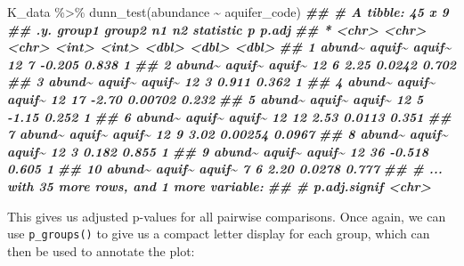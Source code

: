 \documentclass[
]{krantz}
\newenvironment{Shaded}{\begin{snugshade}}{\end{snugshade}}
\newcommand{\DocumentationTok}[1]{\textcolor[rgb]{0.56,0.35,0.01}{\textbf{\textit{#1}}}}
\newcommand{\FunctionTok}[1]{\textcolor[rgb]{0.00,0.00,0.00}{#1}}
\newcommand{\NormalTok}[1]{#1}
\newcommand{\SpecialCharTok}[1]{\textcolor[rgb]{0.00,0.00,0.00}{#1}}
\begin{document}
\begin{Shaded}
\begin{Highlighting}[]
\NormalTok{K\_data }\SpecialCharTok{\%\textgreater{}\%}
  \FunctionTok{dunn\_test}\NormalTok{(abundance }\SpecialCharTok{\textasciitilde{}}\NormalTok{ aquifer\_code)}
\DocumentationTok{\#\# \# A tibble: 45 x 9}
\DocumentationTok{\#\#    .y.    group1 group2    n1    n2 statistic       p  p.adj}
\DocumentationTok{\#\#  * \textless{}chr\textgreater{}  \textless{}chr\textgreater{}  \textless{}chr\textgreater{}  \textless{}int\textgreater{} \textless{}int\textgreater{}     \textless{}dbl\textgreater{}   \textless{}dbl\textgreater{}  \textless{}dbl\textgreater{}}
\DocumentationTok{\#\#  1 abund\textasciitilde{} aquif\textasciitilde{} aquif\textasciitilde{}    12     7    {-}0.205 0.838   1     }
\DocumentationTok{\#\#  2 abund\textasciitilde{} aquif\textasciitilde{} aquif\textasciitilde{}    12     6     2.25  0.0242  0.702 }
\DocumentationTok{\#\#  3 abund\textasciitilde{} aquif\textasciitilde{} aquif\textasciitilde{}    12     3     0.911 0.362   1     }
\DocumentationTok{\#\#  4 abund\textasciitilde{} aquif\textasciitilde{} aquif\textasciitilde{}    12    17    {-}2.70  0.00702 0.232 }
\DocumentationTok{\#\#  5 abund\textasciitilde{} aquif\textasciitilde{} aquif\textasciitilde{}    12     5    {-}1.15  0.252   1     }
\DocumentationTok{\#\#  6 abund\textasciitilde{} aquif\textasciitilde{} aquif\textasciitilde{}    12    12     2.53  0.0113  0.351 }
\DocumentationTok{\#\#  7 abund\textasciitilde{} aquif\textasciitilde{} aquif\textasciitilde{}    12     9     3.02  0.00254 0.0967}
\DocumentationTok{\#\#  8 abund\textasciitilde{} aquif\textasciitilde{} aquif\textasciitilde{}    12     3     0.182 0.855   1     }
\DocumentationTok{\#\#  9 abund\textasciitilde{} aquif\textasciitilde{} aquif\textasciitilde{}    12    36    {-}0.518 0.605   1     }
\DocumentationTok{\#\# 10 abund\textasciitilde{} aquif\textasciitilde{} aquif\textasciitilde{}     7     6     2.20  0.0278  0.777 }
\DocumentationTok{\#\# \# ... with 35 more rows, and 1 more variable:}
\DocumentationTok{\#\# \#   p.adj.signif \textless{}chr\textgreater{}}
\end{Highlighting}
\end{Shaded}

This gives us adjusted p-values for all pairwise comparisons. Once again, we can use \texttt{p\_groups()} to give us a compact letter display for each group, which can then be used to annotate the plot:
\end{document}
